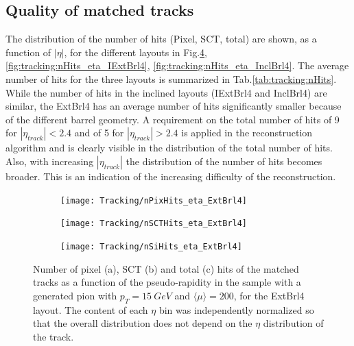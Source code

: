 \documentclass[a4paper,twoside,12pt]{book}
\begin{document}
\subsection{Quality of matched tracks}
The distribution of the number of hits (Pixel, SCT, total) are shown, as a function of $|\eta|$, 
for the different layouts in Fig.\ref{fig:tracking:nHits_eta_ExtBrl4},
 \ref{fig:tracking:nHits_eta_IExtBrl4}, \ref{fig:tracking:nHits_eta_InclBrl4}.
The average number of hits for the three layouts is summarized in Tab.\ref{tab:tracking:nHits}. While
 the number of hits in the inclined layouts (IExtBrl4 and InclBrl4) are similar, the ExtBrl4
 has an average number of hits significantly smaller because of the different barrel geometry. A requirement on the total number of hits of 9 for $|\eta_{track}| < 2.4$ and of 5 for $|\eta_{track}| > 2.4$ is applied in the reconstruction algorithm
 and is clearly visible in the distribution of the total number of hits. Also, with increasing $|\eta_{track}|$ the distribution of the number of hits becomes broader. This is an indication of the increasing
 difficulty of the reconstruction.  \\

\begin{figure}
\begin{subfigure}{\linewidth}
\centering
\texttt{[image: Tracking/nPixHits\_eta\_ExtBrl4]}
\caption{}
\label{fig:tracking:nPixHits_eta_ExtBrl4}
\end{subfigure}

\begin{subfigure}{\linewidth}
\centering
\texttt{[image: Tracking/nSCTHits\_eta\_ExtBrl4]}
\caption{}
\label{fig:tracking:nSCTHits_eta_ExtBrl4}
\end{subfigure}

\begin{subfigure}{\linewidth}
\centering
\texttt{[image: Tracking/nSiHits\_eta\_ExtBrl4]}
\caption{}
\label{fig:tracking:nSiHits_eta_ExtBrl4}
\end{subfigure}
\caption{Number of pixel (a), SCT (b) and total (c) hits of the matched tracks as a function of the pseudo-rapidity in the sample with a generated pion with $p_{T} = 15\ GeV$ and $\langle\mu\rangle = 200$, for the ExtBrl4 layout. The content of each $\eta$ bin was independently normalized so that the overall distribution does not depend on the $\eta$ distribution of the track.}
\label{fig:tracking:nHits_eta_ExtBrl4}
\end{figure}
\end{document}

